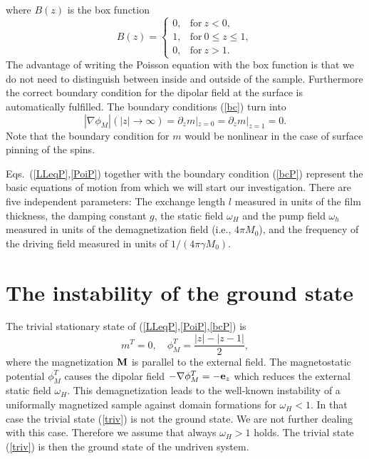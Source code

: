 where $B(z)$ is the box function
\begin{equation}
  B(z)=\left\{\begin{array}{ll}0,&\mbox{for}\ z<0,\\
   1,&\mbox{for}\ 0\le z\le 1,\\0,&\mbox{for}\ z>1.\end{array}
   \right.
  \label{Box}
\end{equation}
The advantage of writing the Poisson equation with the box function 
is that we do not need to distinguish between inside and outside of
the sample.  Furthermore the correct boundary condition for the
dipolar field at the surface is automatically fulfilled. The boundary
conditions (\ref{bc}) turn into
\begin{equation}
  |\nabla\phi_M|(|z|\to\infty)=\partial_zm|_{z=0}=\partial_zm|
   _{z=1}=0.
  \label{bcP}
\end{equation}
Note that the boundary condition for $m$ would be nonlinear in the
case of surface pinning of the spins.

Eqs.~(\ref{LLeqP},\ref{PoiP}) together with the boundary condition
(\ref{bcP}) represent the basic equations of motion from which we
will start our investigation. There are five independent parameters:
The exchange length $l$ measured in units of the film thickness, the
damping constant $g$, the static field $\omega_H$ and the pump field
$\omega_h$ measured in units of the demagnetization field (i.e.,
$4\pi M_0$), and the frequency of the driving field measured in units
of $1/(4\pi\gamma M_0)$. 


\section{\protect\label{INST}The instability of the ground state} 

The trivial stationary state of (\ref{LLeqP},\ref{PoiP},\ref{bcP}) is
\begin{equation}
  m^T=0,\quad \phi^T_M=\frac{|z|-|z-1|}{2},
  \label{triv}
\end{equation}
where the magnetization ${\bf M}$ is parallel to the external field.
The magnetostatic potential $\phi^T_M$ causes the dipolar field
$-\nabla\phi^T_M =-{\bf e}_z$ which reduces the external static field
$\omega_H$. This demagnetization leads to the well-known instability
of a uniformally magnetized sample against domain formations for
$\omega_H<1$. In that case the trivial state (\ref{triv}) is not the
ground state. We are not further dealing with this case.  Therefore
we assume that always $\omega_H>1$ holds. The trivial state 
(\ref{triv}) is then the ground state of the undriven system.

